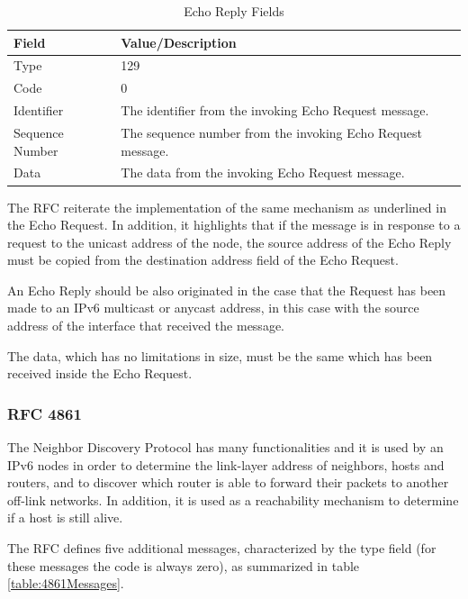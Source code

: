 \documentclass[12pt]{article}
\begin{document}
\begin{savenotes}
\begin{table}[!htpb]
\centering
\addtolength{\tabcolsep}{3pt}
\begin{tabular}{|L{2.0cm}|L{11.0cm}|}
\hline
Field&Value/Description\\
\hline
Type&129\\
\hline
Code&0\\
\hline
Identifier&The identifier from the invoking Echo Request message.\\
\hline
Sequence Number&The sequence number from the invoking Echo Request message.\\
\hline
Data&The data from the invoking Echo Request message.\\
\hline
\end{tabular}
\caption{Echo Reply Fields}
\label{table:echoRepFields}
\end{table}
\end{savenotes}
The RFC reiterate the implementation of the same mechanism as underlined in the Echo Request. In addition, it highlights that if the message is in response to a request to the unicast address of the node, the source address of the Echo Reply must be copied from the destination address field of the Echo Request.

An Echo Reply should be also originated in the case that the Request has been made to an IPv6 multicast or anycast address, in this case with the source address of the interface that received the message.

The data, which has no limitations in size, must be the same which has been received inside the Echo Request.


\subsubsection{RFC 4861}
\label{subsub:4861}

The Neighbor Discovery Protocol has many functionalities and it is used by an IPv6 nodes in order to determine the link-layer address of neighbors, hosts and routers, and to discover which router is able to forward their packets to another off-link networks. In addition, it is used as a reachability mechanism to determine if a host is still alive.

The RFC defines five additional messages, characterized by the type field (for these messages the code is always zero), as summarized in table \ref{table:4861Messages}.
\end{document}
